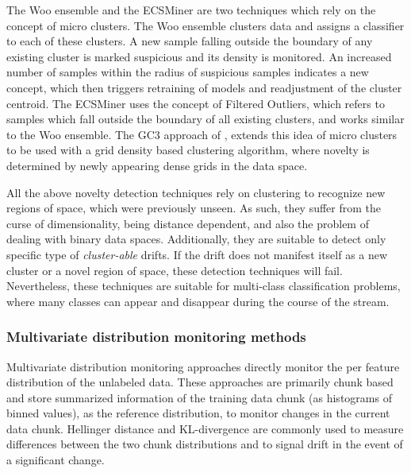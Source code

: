 \documentclass[authoryear,3p,times,twocolumn]{elsarticle}
\begin{document}
The Woo ensemble \citep{ryu2012efficient} and the ECSMiner \citep{masud2011classification} are two techniques which rely on the concept of micro clusters. The Woo ensemble clusters data and assigns a classifier to each of these clusters. A new sample falling outside the boundary of any existing cluster is marked suspicious and its density is monitored. An increased number of samples within the radius of suspicious samples indicates a new concept, which then triggers retraining of models and readjustment of the cluster centroid. The ECSMiner uses the concept of Filtered Outliers, which refers to samples which fall outside the boundary of all existing clusters, and works similar to the Woo ensemble. The GC3 approach of \citep{sethi2016grid}, extends this idea of micro clusters to be used with a grid density based clustering algorithm, where novelty is determined by newly appearing dense grids in the data space. 

All the above novelty detection techniques rely on clustering to recognize new regions of space, which were previously unseen. As such, they suffer from the curse of dimensionality, being distance dependent, and also the problem of dealing with binary data spaces. Additionally, they are suitable to detect only specific type of \textit{cluster-able} drifts. If the drift does not manifest itself as a new cluster or a novel region of space, these detection techniques will fail. Nevertheless, these techniques are suitable for multi-class classification problems, where many classes can appear and disappear during the course of the stream. 

\subsubsection{Multivariate distribution monitoring methods}
\label{sec:lr_multivariate}

Multivariate distribution monitoring approaches directly monitor the per feature distribution of the unlabeled data. These approaches are primarily chunk based and store summarized information of the training data chunk (as histograms of binned values), as the reference distribution, to monitor changes in the current data chunk. Hellinger distance and KL-divergence are commonly used to measure differences between the two chunk distributions \citep{cha2007comprehensive} and to signal drift in the event of a significant change. 
\end{document}

